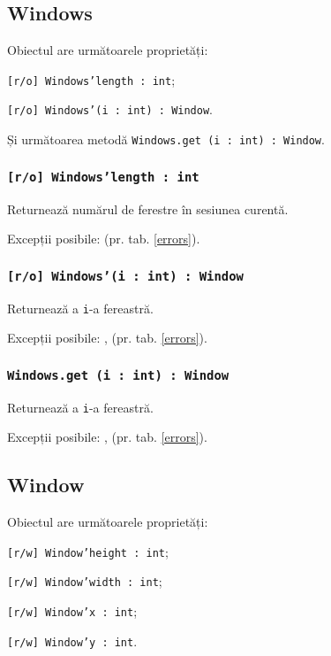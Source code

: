 \subsection{{\color{orange} Windows}}

Obiectul \windows{} are următoarele proprietăți:
\begin{icItems}
	\item \texttt{[r/o] Windows'length : int};
	\item \texttt{[r/o] Windows'(i : int) : Window}.
\end{icItems}

Și următoarea metodă \texttt{Windows.get (i : int) : Window}.

\subsubsection{\texttt{[r/o] Windows'length : int}}

Returnează numărul de ferestre în sesiunea curentă.

Excepții posibile:  (pr. tab. \ref{errors}).

\subsubsection{\texttt{[r/o] Windows'(i : int) : Window}}

Returnează a \texttt{i}-a fereastră.

Excepții posibile: ,  (pr. tab. \ref{errors}).

\subsubsection{\texttt{Windows.get (i : int) : Window}}

Returnează a \texttt{i}-a fereastră.

Excepții posibile: ,  (pr. tab. \ref{errors}).

\subsection{{\color{orange} Window}}

Obiectul \window{} are următoarele proprietăți:
\begin{icItems}
	\item \texttt{[r/w] Window'height : int};
	\item \texttt{[r/w] Window'width : int};
	\item \texttt{[r/w] Window'x : int};
	\item \texttt{[r/w] Window'y : int}.
\end{icItems}

